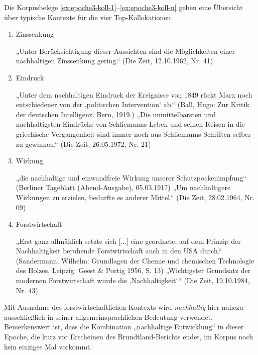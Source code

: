 \documentclass[
    german,
    a4paper,%
    12pt,%
    oneside,%
    toc=bibliography,
    final,
]{scrartcl}
\begin{document}

Die Korpusbelege \ref{ex:epoche3-koll-1}–\ref{ex:epoche3-koll-n} geben eine Übersicht über typische Kontexte für die vier Top-Kollokationen.

\begin{enumerate}
\item Zinssenkung
	\begin{exe}
	\ex \label{ex:epoche3-koll-1} „Unter Berücksichtigung dieser Aussichten sind die Möglichkeiten einer nachhaltigen Zinssenkung gering.“ (Die Zeit, 12.10.1962, Nr. 41)
	\end{exe}
\item Eindruck
	\begin{exe}
	\ex „Unter dem nachhaltigen Eindruck der Ereignisse von 1849 rückt Marx noch entschiedener von der ‚politischen Intervention‘ ab.“ (Ball, Hugo: Zur Kritik der deutschen Intelligenz. Bern, 1919.)
	\ex „Die unmittelbarsten und nachhaltigsten Eindrücke von Schliemanns Leben und seinen Reisen in die griechische Vergangenheit sind immer noch aus Schliemanns Schriften selber zu gewinnen.“ (Die Zeit, 26.05.1972, Nr. 21)
	\end{exe}
\item Wirkung
	\begin{exe}
	\ex „die nachhaltige und einwandfreie Wirkung unserer Schutzpockenimpfung“ (Berliner Tageblatt (Abend-Ausgabe), 05.03.1917)
	\ex „Um nachhaltigere Wirkungen zu erzielen, bedurfte es anderer Mittel.“ (Die Zeit, 28.02.1964, Nr. 09)
	\end{exe}
\item Forstwirtschaft
	\begin{exe}
	\ex „Erst ganz allmählich setzte sich [...] eine geordnete, auf dem Prinzip der Nachhaltigkeit beruhende Forstwirtschaft auch in den USA durch.“ (Sandermann, Wilhelm: Grundlagen der Chemie und chemischen Technologie des Holzes, Leipzig: Geest \& Portig 1956, S. 13)
	\ex \label{ex:epoche3-koll-n} „Wichtigster Grundsatz der modernen Forstwirtschaft wurde die ‚Nachhaltigkeit‘“ (Die Zeit, 19.10.1984, Nr. 43)
	\end{exe}
\end{enumerate}

Mit Ausnahme des forstwirtschaftlichen Kontexts wird \textit{nachhaltig} hier nahezu ausschließlich in seiner allgemeinsprachlichen Bedeutung verwendet. Bemerkenswert ist, dass die Kombination „nachhaltige Entwicklung“ in dieser Epoche, die kurz vor Erscheinen des Brundtland-Berichts endet, im Korpus noch kein einziges Mal vorkommt.
\end{document}

